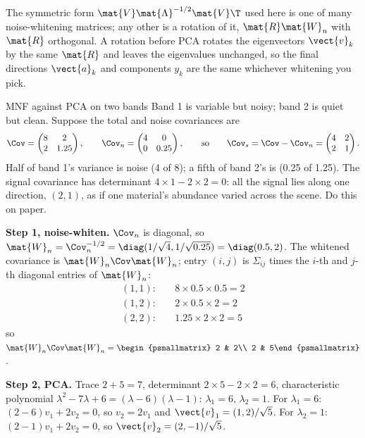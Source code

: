 The symmetric form $\mat{V}\mat{\Lambda}^{-1/2}\mat{V}\T$ used here is one of many noise-whitening
matrices; any other is a rotation of it, $\mat{R}\mat{W}_n$ with $\mat{R}$ orthogonal. A rotation
before PCA rotates the eigenvectors $\vect{v}_k$ by the same $\mat{R}$ and leaves the eigenvalues
unchanged, so the final directions $\vect{a}_k$ and components $y_k$ are the same whichever whitening you
pick.

\begin{worked}[label={we:localrx:mnf2}]{MNF against PCA on two bands}
Band 1 is variable but noisy; band 2 is quiet but clean. Suppose the total and noise covariances are
\[
\Cov = \begin{pmatrix} 8 & 2\\ 2 & 1.25\end{pmatrix},\qquad
\Cov_n = \begin{pmatrix} 4 & 0\\ 0 & 0.25\end{pmatrix},
\qquad\text{so}\qquad
\Cov_s = \Cov - \Cov_n = \begin{pmatrix} 4 & 2\\ 2 & 1\end{pmatrix}.
\]
Half of band 1's variance is noise (4 of 8); a fifth of band 2's is (0.25 of 1.25). The signal
covariance has determinant $4\times1 - 2\times2 = 0$: all the signal lies along one direction,
$(2, 1)$, as if one material's abundance varied across the scene. Do this on paper.

\textbf{Step 1, noise-whiten.} $\Cov_n$ is diagonal, so
$\mat{W}_n = \Cov_n^{-1/2} = \diag(1/\sqrt4, 1/\sqrt{0.25}) = \diag(0.5, 2)$. The whitened covariance is
$\mat{W}_n\Cov\mat{W}_n$; entry $(i,j)$ is $\Sigma_{ij}$ times the $i$-th and $j$-th diagonal entries of
$\mat{W}_n$:
\begin{align*}
(1,1):&\quad 8\times0.5\times0.5 = 2\\
(1,2):&\quad 2\times0.5\times2 = 2\\
(2,2):&\quad 1.25\times2\times2 = 5
\end{align*}
so $\mat{W}_n\Cov\mat{W}_n = \begin{psmallmatrix} 2 & 2\\ 2 & 5\end{psmallmatrix}$.

\textbf{Step 2, PCA.} Trace $2 + 5 = 7$, determinant $2\times5 - 2\times2 = 6$, characteristic
polynomial $\lambda^2 - 7\lambda + 6 = (\lambda - 6)(\lambda - 1)$: $\lambda_1 = 6$, $\lambda_2 = 1$. For
$\lambda_1 = 6$: $(2 - 6)v_1 + 2v_2 = 0$, so $v_2 = 2v_1$ and $\vect{v}_1 = (1, 2)/\sqrt5$. For
$\lambda_2 = 1$: $(2 - 1)v_1 + 2v_2 = 0$, so $\vect{v}_2 = (2, -1)/\sqrt5$.


\end{worked}
